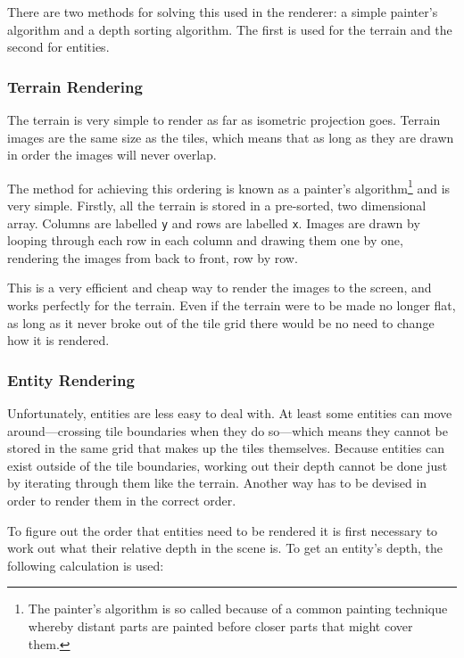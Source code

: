 
There are two methods for solving this used in the renderer: a simple painter's algorithm and a depth sorting algorithm. The first is used for the terrain and the second for entities.

\subsubsection{Terrain Rendering}
The terrain is very simple to render as far as isometric projection goes. Terrain images are the same size as the tiles, which means that as long as they are drawn in order the images will never overlap.

The method for achieving this ordering is known as a painter's algorithm\footnote{The painter's algorithm is so called because of a common painting technique whereby distant parts are painted before closer parts that might cover them.} and is very simple. Firstly, all the terrain is stored in a pre-sorted, two dimensional array. Columns are labelled \texttt{y} and rows are labelled \texttt{x}. Images are drawn by looping through each row in each column and drawing them one by one, rendering the images from back to front, row by row.


This is a very efficient and cheap way to render the images to the screen, and works perfectly for the terrain. Even if the terrain were to be made no longer flat, as long as it never broke out of the tile grid there would be no need to change how it is rendered.

\subsubsection{Entity Rendering}\label{entity_rendering}
Unfortunately, entities are less easy to deal with. At least some entities can move around---crossing tile boundaries when they do so---which means they cannot be stored in the same grid that makes up the tiles themselves. Because entities can exist outside of the tile boundaries, working out their depth cannot be done just by iterating through them like the terrain. Another way has to be devised in order to render them in the correct order.

To figure out the order that entities need to be rendered it is first necessary to work out what their relative depth in the scene is. To get an entity's depth, the following calculation is used:

